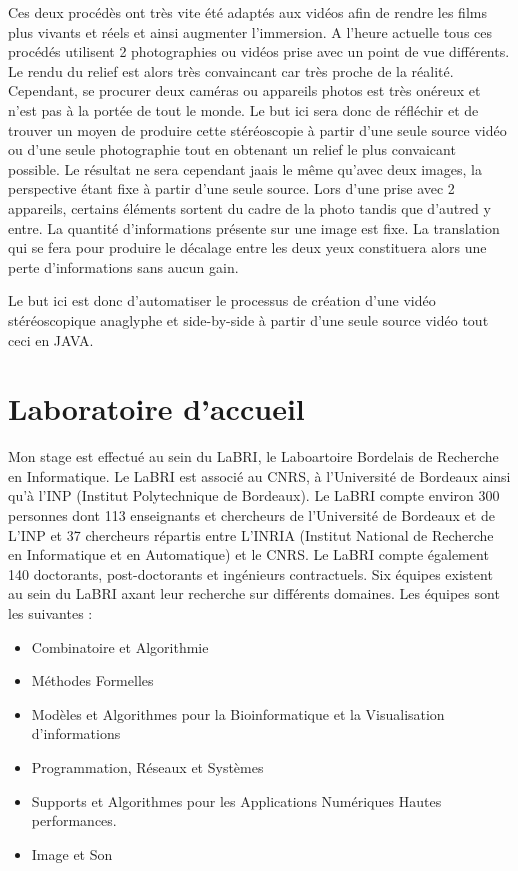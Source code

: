 \documentclass[10pt,a4paper]{article}
\begin{document}
Ces deux procédès ont très vite été adaptés aux vidéos afin de rendre les films plus vivants et réels et ainsi augmenter l'immersion.
A l'heure actuelle tous ces procédés utilisent 2 photographies ou vidéos prise avec un point de vue différents.  Le rendu du relief est alors très convaincant car très proche de la réalité.
Cependant, se procurer deux caméras ou appareils photos est très onéreux et n'est pas à la portée de tout le monde. Le but ici sera donc de réfléchir et de trouver un moyen de produire
cette stéréoscopie à partir d'une seule source vidéo ou d'une seule photographie tout en obtenant un relief le plus convaicant possible. Le résultat ne sera cependant jaais le même qu'avec deux images,
la perspective étant fixe à partir d'une seule source. Lors d'une prise avec 2 appareils, certains éléments sortent du cadre de la photo tandis que d'autred y entre. La quantité
d'informations présente sur une image est fixe. La translation qui se fera pour produire le décalage entre les deux yeux constituera alors une perte d'informations sans aucun gain.

Le but ici est donc d'automatiser le processus de création d'une vidéo stéréoscopique anaglyphe et side-by-side à partir d'une seule source vidéo tout ceci en JAVA.

\section{Laboratoire d'accueil}

Mon stage est effectué au sein du LaBRI, le Laboartoire Bordelais de Recherche en Informatique. Le LaBRI est associé au CNRS, à l'Université de Bordeaux ainsi qu'à l'INP (Institut Polytechnique de Bordeaux).
Le LaBRI compte environ 300 personnes dont 113 enseignants et chercheurs de l'Université de Bordeaux et de L'INP et 37 chercheurs répartis entre L'INRIA (Institut National de Recherche en Informatique et en Automatique) et le CNRS. Le LaBRI compte également 140 doctorants, post-doctorants et ingénieurs contractuels.
Six équipes existent au sein du LaBRI axant leur recherche sur différents domaines. Les équipes sont les suivantes :\\

\begin{itemize}
\item Combinatoire et Algorithmie
\item Méthodes Formelles
\item Modèles et Algorithmes pour la Bioinformatique et la Visualisation d'informations
\item Programmation, Réseaux et Systèmes
\item Supports et Algorithmes pour les Applications Numériques Hautes performances.
\item Image et Son\\
\end{itemize}
\end{document}
